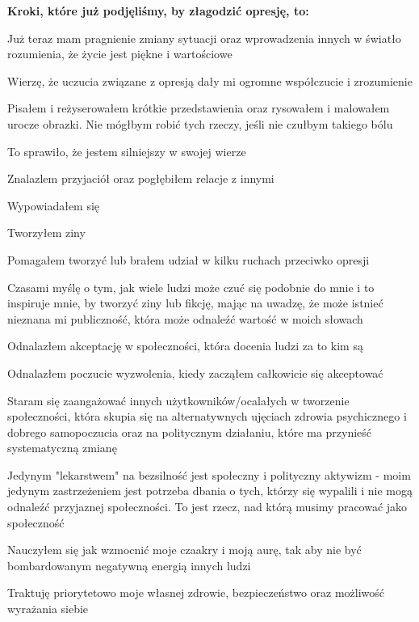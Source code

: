 \noindent\textcolor{ProcessBlue}{\textbf{\LARGE{Kroki, które już podjęliśmy, by złagodzić opresję, to:}}}\\

\begin{multicols}{2}
	\begin{checkboxlist}
		\item Już teraz mam pragnienie zmiany sytuacji oraz wprowadzenia innych w światło rozumienia, że życie jest piękne i wartościowe
		\item Wierzę, że uczucia związane z opresją dały mi ogromne współczucie i zrozumienie
		\item Pisałem i reżyserowałem krótkie przedstawienia oraz rysowałem i malowałem urocze obrazki. Nie mógłbym robić tych rzeczy, jeśli nie czułbym takiego bólu
		\item To sprawiło, że jestem silniejszy w swojej wierze
		\item Znalazlem przyjaciół oraz pogłębiłem relacje z innymi
		\item Wypowiadałem się
		\item Tworzyłem ziny
		\item Pomagałem tworzyć lub brałem udział w kilku ruchach przeciwko opresji
		\item Czasami myślę o tym, jak wiele ludzi może czuć się podobnie do mnie i to inspiruje mnie, by tworzyć ziny lub fikcję, mając na uwadzę, że może istnieć nieznana mi publiczność, która może odnaleźć wartość w moich słowach
		\item Odnalazłem akceptację w społeczności, która docenia ludzi za to kim są
		\item Odnalazłem poczucie wyzwolenia, kiedy zacząłem całkowicie się akceptować
		\item Staram się zaangażować innych użytkowników/ocalałych w tworzenie społeczności, która skupia się na alternatywnych ujęciach zdrowia psychicznego i dobrego samopoczucia oraz na politycznym działaniu, które ma przynieść systematyczną zmianę
		\item Jedynym "lekarstwem" na bezsilność jest społeczny i polityczny aktywizm - moim jedynym zastrzeżeniem jest potrzeba dbania o tych, którzy się wypalili i nie mogą odnaleźć przyjaznej społeczności. To jest rzecz, nad którą musimy pracować jako społeczność
		\item Nauczyłem się jak wzmocnić moje czaakry i moją aurę, tak aby nie być bombardowanym negatywną energią innych ludzi
		\item Traktuję priorytetowo moje własnej zdrowie, bezpieczeństwo oraz możliwość wyrażania siebie

\end{checkboxlist}
\end{multicols}
